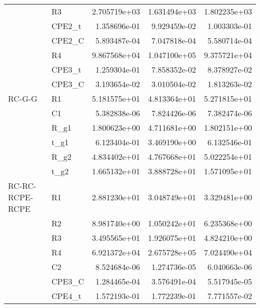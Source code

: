\begin{tabular}{llrrr}
                    &        R3 & 2.705719e+03 &     1.631494e+03 &              1.802235e+03 \\
                    &    CPE2\_t & 1.358696e-01 &     9.929459e-02 &              1.003303e-01 \\
                    &    CPE2\_C & 5.893487e-04 &     7.047818e-04 &              5.580714e-04 \\
                    &        R4 & 9.867568e+04 &     1.047100e+05 &              9.375721e+04 \\
                    &    CPE3\_t & 1.259304e-01 &     7.858352e-02 &              8.378927e-02 \\
                    &    CPE3\_C & 3.193654e-02 &     3.010504e-02 &              1.813263e-02 \\
             RC-G-G &        R1 & 5.181575e+01 &     4.813364e+01 &              5.271815e+01 \\
                    &        C1 & 5.382838e-06 &     7.824426e-06 &              7.382474e-06 \\
                    &      R\_g1 & 1.800623e+00 &     4.711681e+00 &              1.802151e+00 \\
                    &      t\_g1 & 6.123404e-01 &     3.469190e+00 &              6.132546e-01 \\
                    &      R\_g2 & 4.834402e+01 &     4.767668e+01 &              5.022254e+01 \\
                    &      t\_g2 & 1.665132e+01 &     3.888728e+01 &              1.571095e+01 \\
    RC-RC-RCPE-RCPE &        R1 & 2.881230e+01 &     3.048749e+01 &              3.329481e+00 \\
                    &        R2 & 8.981740e+00 &     1.050242e+01 &              6.235368e+00 \\
                    &        R3 & 3.495565e+01 &     1.926075e+01 &              4.824210e+00 \\
                    &        R4 & 6.921372e+04 &     2.675728e+05 &              7.024490e+04 \\
                    &        C2 & 8.524684e-06 &     1.274736e-05 &              6.040663e-06 \\
                    &    CPE3\_C & 1.284465e-04 &     3.576491e-04 &              5.517945e-05 \\
                    &    CPE4\_t & 1.572193e-01 &     1.772239e-01 &              7.771557e-02 \\

\end{tabular}

